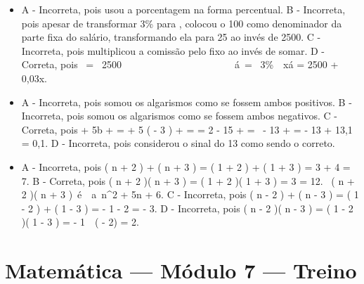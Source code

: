 \begin{itemize}
\item A - Incorreta, pois usou a porcentagem na forma percentual.
B - Incorreta, pois apesar de transformar 3\% para ,
colocou o 100 como denominador da parte fixa do salário, transformando
ela para 25 ao invés de 2500.
C - Incorreta, pois multiplicou a comissão pelo fixo ao invés de somar.
D - Correta, pois \  = \ 2500\ \ \ \ \ \ \ \ \ \ \ \ \ \ \ \ \ \ \ \ \ \ \ á\  = \ 3\%\ \ x\text{\ \ \ \ \ \ \ \ \ \ \ \ \ \ \ \ \ }á = 2500 + 0,03x.
\item A - Incorreta, pois somou os algarismos como se fossem ambos positivos.
B - Incorreta, pois somou os algarismos como se fossem ambos negativos.
C - Correta, pois  + 5b +  =  + 5 \times \left( - 3 \right) +  = = 2 - 15 +  = \  - 13 +  = - 13 + 13,1 = 0,1.
D - Incorreta, pois considerou o sinal do 13 como sendo o correto.
\item A - Incorreta, pois
\left( n + 2 \right) + \left( n + 3 \right) = \left( 1 + 2 \right) + \left( 1 + 3 \right) = 3 + 4 = 7.
B - Correta, pois \left( n + 2 \right)\left( n + 3 \right) = \left( 1 + 2 \right)\left( 1 + 3 \right) = 3  = 12. \therefore\ \left( n + 2 \right)\left( n + 3 \right)\ é\ \ a\ n^{2} + 5n + 6.
C - Incorreta, pois
\left( n - 2 \right) + \left( n - 3 \right) = \left( 1 - 2 \right) + \left( 1 - 3 \right) = - 1 - 2 = - 3.
D - Incorreta, pois
\left( n - 2 \right)\left( n - 3 \right) = \left( 1 - 2 \right)\left( 1 - 3 \right) = - 1\  \times \ ( - 2) = 2.
\end{itemize}

\section*{Matemática — Módulo 7 — Treino}

